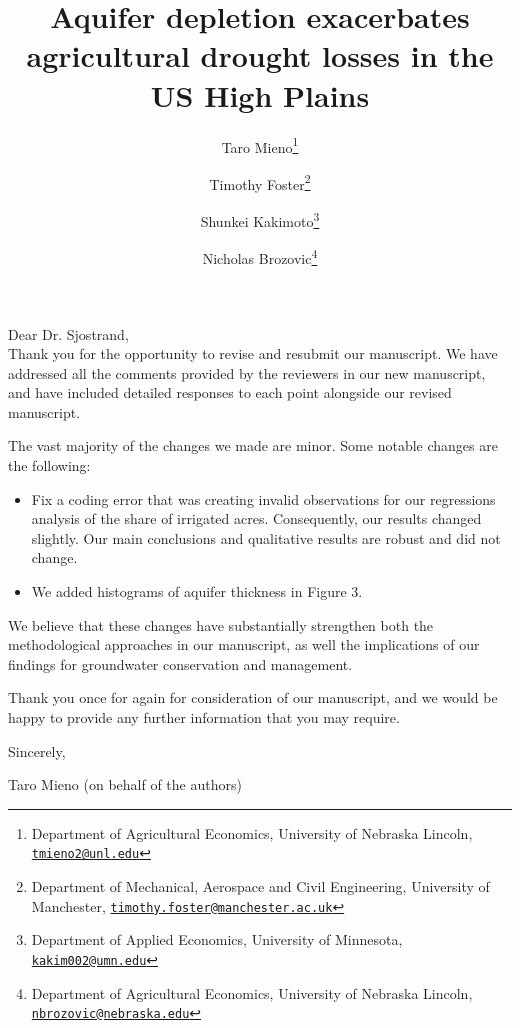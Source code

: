 \documentclass[
]{article}
\title{Aquifer depletion exacerbates agricultural drought losses in the US High Plains}
\author{Taro Mieno\footnote{Department of Agricultural Economics, University of Nebraska Lincoln, \href{mailto:tmieno2@unl.edu}{\nolinkurl{tmieno2@unl.edu}}} \and Timothy Foster\footnote{Department of Mechanical, Aerospace and Civil Engineering, University of Manchester, \href{mailto:timothy.foster@manchester.ac.uk}{\nolinkurl{timothy.foster@manchester.ac.uk}}} \and Shunkei Kakimoto\footnote{Department of Applied Economics, University of Minnesota, \href{mailto:kakim002@umn.edu}{\nolinkurl{kakim002@umn.edu}}} \and Nicholas Brozovic\footnote{Department of Agricultural Economics, University of Nebraska Lincoln, \href{mailto:nbrozovic@nebraska.edu}{\nolinkurl{nbrozovic@nebraska.edu}}}}
\date{}
\begin{document}
\maketitle

Dear Dr. Sjostrand,\\

Thank you for the opportunity to revise and resubmit our manuscript. We have addressed all the comments provided by the reviewers in our new manuscript, and have included detailed responses to each point alongside our revised manuscript. 

The vast majority of the changes we made are minor. Some notable changes are the following:

\begin{itemize}
    \item Fix a coding error that was creating invalid observations for our regressions analysis of the share of irrigated acres. Consequently, our results changed slightly. Our main conclusions and qualitative results are robust and did not change. 
    \item We added histograms of aquifer thickness in Figure 3.
\end{itemize}

We believe that these changes have substantially strengthen both the methodological approaches in our manuscript, as well the implications of our findings for groundwater conservation and management. 

Thank you once for again for consideration of our manuscript, and we would be happy to provide any further information that you may require.

Sincerely,

Taro Mieno (on behalf of the authors)
\end{document}
